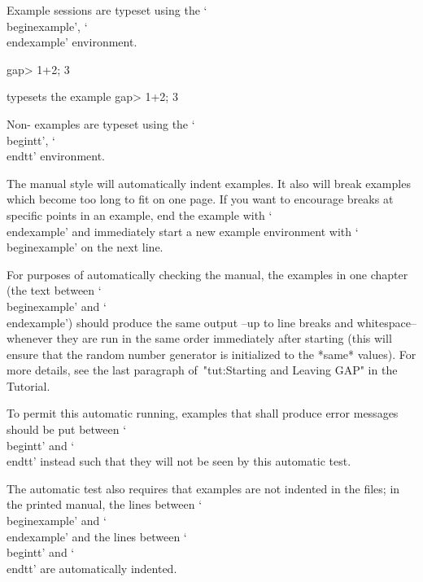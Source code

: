 Example {\GAP} sessions are typeset using the `\\beginexample',
`\\endexample' environment. 

\begintt
\beginexample
gap> 1+2;
3
\endexample
\endtt

typesets the example
\beginexample
gap> 1+2;
3
\endexample

Non-{\GAP} examples are typeset using the `\\begintt', `\\endtt'
environment.

The manual style will automatically indent examples. It also will break
examples which become too long to fit on one page. If you want to encourage
breaks at specific points in an example, end the example with `\\endexample'
and immediately start a new example environment with `\\beginexample' on
the next line.


For purposes of automatically checking the manual,
the {\GAP} examples in one chapter (the text between `\\beginexample'
and `\\endexample') should produce the same output --up to line breaks
and whitespace-- whenever they are run in the same order
immediately after starting {\GAP}
(this will ensure that the random number generator is initialized to the
*same* values).
For more details,
see the last paragraph of~"tut:Starting and Leaving GAP" in the Tutorial.

To permit this automatic running,
examples that shall produce error messages should be put between
`\\begintt' and `\\endtt' instead
such that they will not be seen by this automatic test.

The automatic test also requires that examples are not indented
in the files;
in the printed manual,
the lines between `\\beginexample' and `\\endexample'
and the lines between `\\begintt' and `\\endtt' are automatically
indented.


